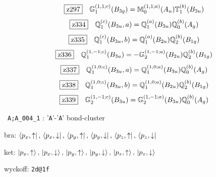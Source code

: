 \documentclass[fleqn,10pt,landscape]{jsarticle}
\begin{document}
\begin{dmath*}
\hspace*{3mm}\fbox{z297}\quad \mathbb{G}_{1}^{(1,1;c)}(B_{3g})=\mathbb{M}_{0}^{(1,1;a)}(A_{u}) \mathbb{T}_{1}^{(b)}(B_{3u})
\end{dmath*}
\begin{dmath*}
\hspace*{3mm}\fbox{z334}\quad \mathbb{Q}_{1}^{(c)}(B_{3u},a)=\mathbb{Q}_{1}^{(a)}(B_{3u}) \mathbb{Q}_{0}^{(b)}(A_{g})
\end{dmath*}
\begin{dmath*}
\hspace*{3mm}\fbox{z335}\quad \mathbb{Q}_{1}^{(c)}(B_{3u},b)=\mathbb{Q}_{1}^{(a)}(B_{2u}) \mathbb{Q}_{2}^{(b)}(B_{1g})
\end{dmath*}
\begin{dmath*}
\hspace*{3mm}\fbox{z336}\quad \mathbb{Q}_{1}^{(1,-1;c)}(B_{3u})=- \mathbb{G}_{2}^{(1,-1;a)}(B_{2u}) \mathbb{Q}_{2}^{(b)}(B_{1g})
\end{dmath*}
\begin{dmath*}
\hspace*{3mm}\fbox{z337}\quad \mathbb{Q}_{1}^{(1,0;c)}(B_{3u},a)=\mathbb{Q}_{1}^{(1,0;a)}(B_{3u}) \mathbb{Q}_{0}^{(b)}(A_{g})
\end{dmath*}
\begin{dmath*}
\hspace*{3mm}\fbox{z338}\quad \mathbb{Q}_{1}^{(1,0;c)}(B_{3u},b)=\mathbb{Q}_{1}^{(1,0;a)}(B_{2u}) \mathbb{Q}_{2}^{(b)}(B_{1g})
\end{dmath*}
\begin{dmath*}
\hspace*{3mm}\fbox{z339}\quad \mathbb{G}_{2}^{(1,-1;c)}(B_{3u})=\mathbb{G}_{2}^{(1,-1;a)}(B_{3u}) \mathbb{Q}_{0}^{(b)}(A_{g})
\end{dmath*}
\vspace{5mm}

\noindent\textbullet\, \texttt{A;A_004_1} : '\texttt{A}'-'\texttt{A}' bond-cluster

\noindent\quad * bra: $\bra{p_{x},\uparrow},\, \bra{p_{x},\downarrow},\, \bra{p_{y},\uparrow},\, \bra{p_{y},\downarrow},\, \bra{p_{z},\uparrow},\, \bra{p_{z},\downarrow}$

\noindent\quad * ket: $\ket{p_{x},\uparrow},\, \ket{p_{x},\downarrow},\, \ket{p_{y},\uparrow},\, \ket{p_{y},\downarrow},\, \ket{p_{z},\uparrow},\, \ket{p_{z},\downarrow}$

\noindent\quad * wyckoff: \texttt{2d@1f}
\end{document}

